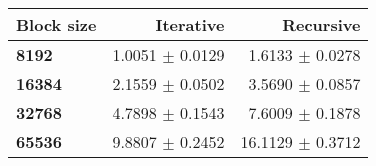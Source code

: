 \begin{tabular}{lrr}\toprule
\textbf{Block size}  & \textbf{Iterative} & \textbf{Recursive}\\\midrule
\textbf{8192}  & 1.0051 $\pm$ 0.0129 & 1.6133 $\pm$ 0.0278\\
\textbf{16384}  & 2.1559 $\pm$ 0.0502 & 3.5690 $\pm$ 0.0857\\
\textbf{32768}  & 4.7898 $\pm$ 0.1543 & 7.6009 $\pm$ 0.1878\\
\textbf{65536} & 9.8807 $\pm$ 0.2452 & 16.1129 $\pm$ 0.3712\\
\bottomrule
\end{tabular}
